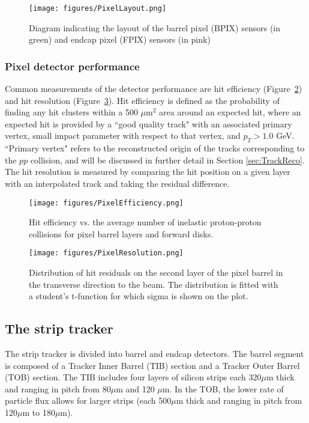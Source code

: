\begin{figure}\centering
  \texttt{[image: figures/PixelLayout.png]}
  \caption{\label{fig:PixelLayout} Diagram indicating the layout of the barrel pixel (BPIX) sensors (in green) and endcap pixel (FPIX) sensors (in pink)}
\end{figure}

\subsubsection{Pixel detector performance}

Common measurements of the detector performance are hit efficiency (Figure~\ref{fig:PixelEfficiency}) and hit resolution (Figure~\ref{fig:PixelResolution}). Hit efficiency is defined as the probability of finding any hit clusters within a 500 $\mu$m$^2$ area around an expected hit, where an expected hit is provided by a ``good quality track" with an associated primary vertex, small impact parameter with respect to that vertex, and $p_{T} > 1.0$ GeV. ``Primary vertex" refers to the reconstructed origin of the tracks corresponding to the $pp$ collision, and will be discussed in further detail in Section \ref{sec:TrackReco}. The hit resolution is measured by comparing the hit position on a given layer with an interpolated track and taking the residual difference.\cite{PixelPerformance}

\begin{figure}\centering
  \texttt{[image: figures/PixelEfficiency.png]}
  \caption{\label{fig:PixelEfficiency} Hit efficiency vs. the average number of inelastic proton-proton collisions for pixel barrel layers and forward disks.}
\end{figure}

\begin{figure}\centering
  \texttt{[image: figures/PixelResolution.png]}
  \caption{\label{fig:PixelResolution} Distribution of hit residuals on the second layer of the pixel barrel in the transverse direction to the beam. The distribution is fitted with a student's t-function for which sigma is shown on the plot.}
\end{figure}

\subsection{The strip tracker}

The strip tracker is divided into barrel and endcap detectors. The barrel segment is composed of a Tracker Inner Barrel (TIB) section and a Tracker Outer Barrel (TOB) section. The TIB includes four layers of silicon strips each 320$\mu$m thick and ranging in pitch from 80$\mu$m and 120 $\mu$m. In the TOB, the lower rate of particle flux allows for larger strips (each 500$\mu$m thick and ranging in pitch from 120$\mu$m to 180$\mu$m).

